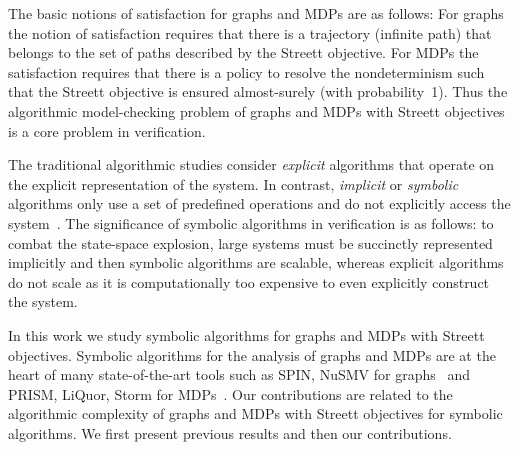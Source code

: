 \vspace{-0.5mm}
\smallskip{} 
The basic notions of satisfaction for graphs and MDPs are as follows:
For graphs the notion of satisfaction requires that there is a trajectory (infinite path) 
that belongs to the set of paths described by the Streett objective.
For MDPs the satisfaction requires that there is a policy to resolve the nondeterminism 
such that the Streett objective is ensured almost-surely (with probability~1).
Thus the algorithmic model-checking problem of graphs and MDPs with Streett objectives is a 
core problem in verification.

\vspace{-0.5mm}
\smallskip{}
The traditional algorithmic studies consider {\em explicit} algorithms that 
operate on the explicit representation of the system. In contrast, 
{\em implicit} or {\em symbolic} algorithms only use a set of predefined operations 
and do not explicitly access the system~\cite{ClarkeGP99}.
The significance of symbolic algorithms in verification is as follows:
to combat the state-space explosion, large systems must be succinctly represented 
implicitly and then symbolic algorithms are scalable, 
whereas explicit algorithms do not scale as it is computationally too expensive
to even explicitly construct the system.

\vspace{-0.5mm}
\smallskip{} 
In this work we study symbolic algorithms for graphs and MDPs with Streett objectives.
Symbolic algorithms for the analysis of graphs and MDPs are at the heart of many state-of-the-art
tools such as SPIN, NuSMV for graphs~\cite{SPIN,NUSMV} and PRISM, LiQuor, Storm for MDPs~\cite{PRISM,LIQUOR,STORM}.
Our contributions are related to the algorithmic complexity of graphs and MDPs with 
Streett objectives for symbolic algorithms. 
We first present previous results and then our contributions.

